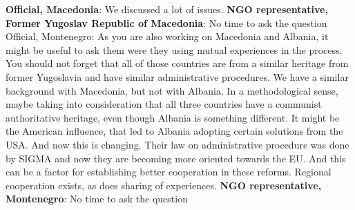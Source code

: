 \textbf{Official, Macedonia}: We discussed a lot of issues.
\textbf{NGO representative, Former Yugoslav Republic of Macedonia}: No time to ask the question
Official, Montenegro: As you are also working on Macedonia and Albania, it might be useful to ask them were they using mutual experiences in the process. You should not forget that all of those countries are from a similar heritage from former Yugoslavia and have similar administrative procedures. We have a similar background with Macedonia, but not with Albania. In a methodological sense, maybe taking into consideration that all three countries have a communist authoritative heritage, even though Albania is something different. It might be the American influence, that led to Albania adopting certain solutions from the USA. And now this is changing. Their law on administrative procedure was done by SIGMA and now they are becoming more oriented towards the EU. And this can be a factor for establishing better cooperation in these reforms. Regional cooperation exists, as does sharing of experiences.
\textbf{NGO representative, Montenegro}: No time to ask the question